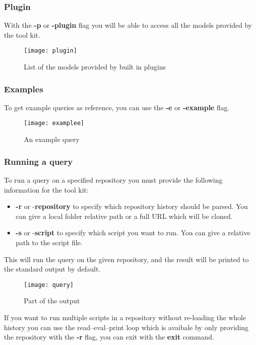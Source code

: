 \subsubsection{Plugin}
With the \textbf{-p} or \textbf{-plugin} flag you will be able to access all the models provided by the tool kit.

\begin{figure}[H]
	\centering
	\texttt{[image: plugin]}
	\caption{List of the models provided by built in plugins}
	\label{fig:fig-plugin}
\end{figure}

\subsubsection{Examples}
To get example queries as reference, you can use the \textbf{-e} or \textbf{-example} flag.

\begin{figure}[H]
	\centering
	\texttt{[image: examplee]}
	\caption{An example query}
	\label{fig:fig-example}
\end{figure}

\subsubsection{Running a query}
To run a query on a specified repository you must provide the following information for the tool kit:

\begin{itemize}
	\item \textbf{-r} or -\textbf{repository} to specify which repository history should be parsed. You can give a local folder relative path or a full URL which will be cloned.
	\item \textbf{-s} or -\textbf{script} to specify which script you want to run. You can give a relative path to the script file.
\end{itemize}

This will run the query on the given repository, and the result will be printed to the standard output by default.

\begin{figure}[H]
	\centering
	\texttt{[image: query]}
	\caption{Part of the output}
	\label{fig:fig-query}
\end{figure}

If you want to run multiple scripts in a repository without re-loading the whole history you can use the read–eval–print loop which is avaibale by only providing the repository with the \textbf{-r} flag, you can exit with the \textbf{exit} command.

